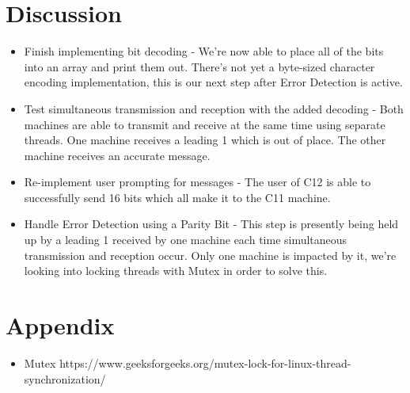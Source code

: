\documentclass{article}
\begin{document}
\section*{Discussion}
\begin{itemize}
\item Finish implementing bit decoding - We're now able to place all of the bits into an array and print them out. There's not yet a byte-sized character encoding implementation, this is our next step after Error Detection is active.

\item Test simultaneous transmission and reception with the added decoding - Both machines are able to transmit and receive at the same time using separate threads. One machine receives a leading 1 which is out of place. The other machine receives an accurate message.

\item Re-implement user prompting for messages - The user of C12 is able to successfully send 16 bits which all make it to the C11 machine.

\item Handle Error Detection using a Parity Bit - This step is presently being held up by a leading 1 received by one machine each time simultaneous transmission and reception occur. Only one machine is impacted by it, we're looking into locking threads with Mutex in order to solve this.

\end{itemize}
\section*{Appendix}
\begin{itemize}
\item Mutex https://www.geeksforgeeks.org/mutex-lock-for-linux-thread-synchronization/
\end{itemize}
\end{document}
